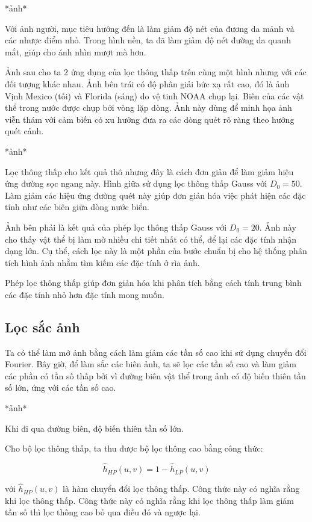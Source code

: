 \documentclass[12pt,a4paper]{report}
\numberwithin{equation}{section}
\theoremstyle{definition} %
\begin{document}
*ảnh*

Với ảnh người, mục tiêu hướng đến là làm giảm độ nét của đương da mảnh và các nhược điểm nhỏ. Trong hình nền, ta đã làm giảm độ nét đường da quanh mắt, giúp cho ánh nhìn mượt mà hơn.

Ảnh sau cho ta 2 ứng dụng của lọc thông thấp trên cùng một hình nhưng với các đối tượng khác nhau. Ảnh bên trái có độ phân giải bức xạ rất cao, đó là ảnh Vịnh Mexico (tối) và Florida (sáng) do vệ tinh NOAA chụp lại. Biên của các vật thể trong nước được chụp bởi vòng lặp dòng. Ảnh này dùng để minh họa ảnh viễn thám với cảm biến có xu hướng đưa ra các dòng quét rõ ràng theo hướng quét cảnh.

*ảnh*

Lọc thông thấp cho kết quả thô nhưng đây là cách đơn giản để làm giảm hiệu ứng đường sọc ngang này. Hình giữa sử dụng lọc thông thấp Gauss với $D_0=50$. Làm giảm các hiệu ứng đường quét này giúp đơn giản hóa việc phát hiện các đặc tính như các biên giữa dòng nước biển.

Ảnh bên phải là kết quả của phép lọc thông thấp Gauss với $D_0=20$. Ảnh này cho thấy vật thể bị làm mờ nhiều chi tiết nhất có thể, để lại các đặc tính nhận dạng lớn. Cụ thể, cách lọc này là một phần của bước chuẩn bị cho hệ thống phân tích hình ảnh nhằm tìm kiếm các đặc tính ở rìa ảnh.

Phép lọc thông thấp giúp đơn giản hóa khi phân tích bằng cách tính trung bình các đặc tính nhỏ hơn đặc tính mong muốn.
\subsection{Lọc sắc ảnh}

Ta có thể làm mở ảnh bằng cách làm giảm các tần số cao khi sử dụng chuyển đổi Fourier. Bây giờ, để làm sắc các biên ảnh, ta sẽ lọc các tần số cao và làm giảm các phần có tần số thấp bởi vì đường biên vật thể trong ảnh có độ biến thiên tần số lớn, ứng với các tần số cao.

*ảnh*

Khi đi qua đường biên, độ biến thiên tần số lớn.

Cho bộ lọc thông thấp, ta thu được bộ lọc thông cao bằng công thức:

\begin{equation}
    \hat{h}_{HP}(u,v) = 1 - \hat{h}_{LP}(u,v)
\end{equation}

với $\hat{h}_{HP}(u,v)$ là hàm chuyển đổi lọc thông thấp. Công thức này có nghĩa rằng khi lọc thông thấp. Công thức này có nghĩa rằng khi lọc thông thấp làm giảm tần số thì lọc thông cao bỏ qua điều đó và ngược lại.
\end{document}
